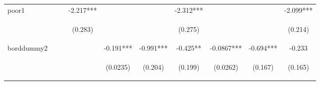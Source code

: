 \documentclass{article}[11pt,subeqn]
\begin{document}
\begin{spacing}{1.25}
\begin{sidewaystable}[!htbp]
\begin{center}
\begin{tabular}{lccccccccc}
poor1 &  &  & -2.217*** &  &  & -2.312*** &  &  & -2.099*** \\
\vspace{4pt} & \begin{footnotesize}\end{footnotesize} & \begin{footnotesize}\end{footnotesize} & \begin{footnotesize}(0.283)\end{footnotesize} & \begin{footnotesize}\end{footnotesize} & \begin{footnotesize}\end{footnotesize} & \begin{footnotesize}(0.275)\end{footnotesize} & \begin{footnotesize}\end{footnotesize} & \begin{footnotesize}\end{footnotesize} & \begin{footnotesize}(0.214)\end{footnotesize} \\
borddummy2 &  &  &  & -0.191*** & -0.991*** & -0.425** & -0.0867*** & -0.694*** & -0.233 \\
\vspace{4pt} & \begin{footnotesize}\end{footnotesize} & \begin{footnotesize}\end{footnotesize} & \begin{footnotesize}\end{footnotesize} & \begin{footnotesize}(0.0235)\end{footnotesize} & \begin{footnotesize}(0.204)\end{footnotesize} & \begin{footnotesize}(0.199)\end{footnotesize} & \begin{footnotesize}(0.0262)\end{footnotesize} & \begin{footnotesize}(0.167)\end{footnotesize} & \begin{footnotesize}(0.165)\end{footnotesize} \\

\end{tabular}
\end{center}
\end{sidewaystable}
\end{spacing}
\end{document}

